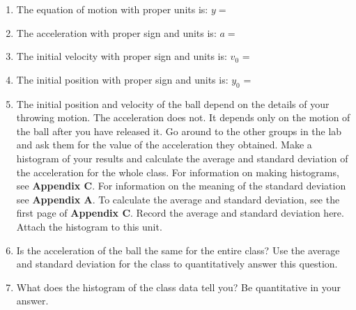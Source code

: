 \begin{enumerate}
\item The equation of motion with proper units is: $y =$\vspace{5mm}

\item The acceleration with proper sign and units is: $a =$ \vspace{5mm}

\item The initial velocity with proper sign and units is: \(v_{0} \) = \vspace{5mm}

\item The initial position with proper sign and units is: \(y_{0} \) = \vspace{5mm}

\item The initial position and velocity of the ball depend on the details of 
your throwing motion. The acceleration does not. It depends only on the motion 
of the ball after you have released it. Go around to the other groups in the 
lab and ask them for the value of the acceleration they obtained.
Make a histogram of your results and calculate the average and standard 
deviation of the acceleration for the whole class. For information on making 
histograms, see \textbf{Appendix C}. For information on the meaning of the 
standard deviation see \textbf{Appendix A}. To calculate the average and
standard deviation, see the first page of \textbf{Appendix C}. Record the 
average and standard deviation here. Attach the histogram to this unit.
\vspace{20mm}

\item Is the acceleration of the ball the same for the entire class? Use the 
average and standard deviation for the class to quantitatively answer this 
question.
\vspace{20mm}

\item What does the histogram of the class data tell you? Be quantitative in 
your answer.
\vspace{20mm}

\end{enumerate}
